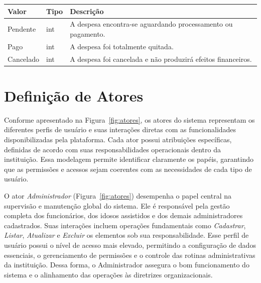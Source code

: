 \begin{quadro}[H]
\caption[Dicionário de dados do enum Status]{Dicionário de dados do enum Status}
\label{quad:dicionario-de-dados-do-enum-status}

\begin{tabular}{|p{}|p{}|p{}|}
\hline
\textbf{Valor} & \textbf{Tipo} & \textbf{Descrição} \\ 
\hline
Pendente & int & A despesa encontra-se aguardando processamento ou pagamento. \\ 
\hline
Pago & int & A despesa foi totalmente quitada. \\ 
\hline
Cancelado & int & A despesa foi cancelada e não produzirá efeitos financeiros. \\ 
\hline
\end{tabular}


\end{quadro}


\section{Definição de Atores}

Conforme apresentado na Figura~\ref{fig:atores}, os atores do sistema representam os diferentes perfis de usuário e suas interações diretas com as funcionalidades disponibilizadas pela plataforma. Cada ator possui atribuições específicas, definidas de acordo com suas responsabilidades operacionais dentro da instituição. Essa modelagem permite identificar claramente os papéis, garantindo que as permissões e acessos sejam coerentes com as necessidades de cada tipo de usuário.

O ator \textit{Administrador} (Figura~\ref{fig:atores}) desempenha o papel central na supervisão e manutenção global do sistema. Ele é responsável pela gestão completa dos funcionários, dos idosos assistidos e dos demais administradores cadastrados. Suas interações incluem operações fundamentais como \textit{Cadastrar}, \textit{Listar}, \textit{Atualizar} e \textit{Excluir} os elementos sob sua responsabilidade. Esse perfil de usuário possui o nível de acesso mais elevado, permitindo a configuração de dados essenciais, o gerenciamento de permissões e o controle das rotinas administrativas da instituição. Dessa forma, o Administrador assegura o bom funcionamento do sistema e o alinhamento das operações às diretrizes organizacionais.


